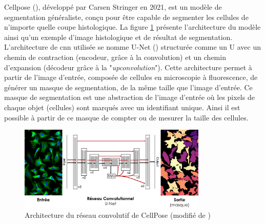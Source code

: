 Cellpose (\cite{stringer_cellpose_2021}), développé par Carsen Stringer en 2021, est un modèle de segmentation généraliste, conçu pour être capable de segmenter les cellules de n'importe quelle coupe histologique. La figure \ref{fig:cellpose_archi} présente l'architecture du modèle ainsi qu'un exemple d'image histologique et de résultat de segmentation. L'architecture de \gls{cnn} utilisée se nomme U-Net (\cite{ronneberger_u-net_2015}) structurée comme un U avec un chemin de contraction (encodeur, grâce à la convolution) et un chemin d'expansion (décodeur grâce à la "\textit{upconvolution}"). Cette architecture permet à partir de l'image d'entrée, composée de cellules en microscopie à fluorescence, de générer un masque de segmentation, de la même taille que l'image d'entrée. Ce masque de segmentation est une abstraction de l'image d'entrée où les pixels de chaque objet (cellules) sont marqués avec un identifiant unique. Ainsi il est possible à partir de ce masque de compter ou de mesurer la taille des cellules.
\begin{figure}[!ht]
 \centering
 \includegraphics[width=0.8\textwidth]{figures/cellpose_archi.png}
 \caption[Architecture du réseau convolutionel de CellPose]{Architecture du réseau convolutif de CellPose (modifié de \cite{stringer_cellpose_2021})}
 \label{fig:cellpose_archi}
\end{figure}
